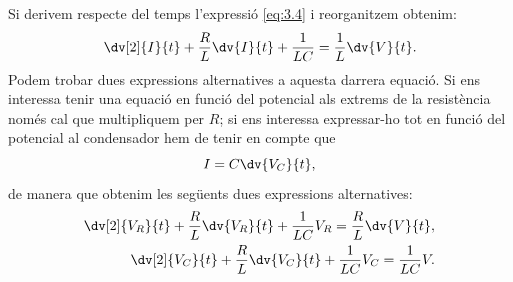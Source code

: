 \documentclass[a4paper,10.5pt]{report}
\begin{document}
Si derivem respecte del temps l'expressió \eqref{eq:3.4} i reorganitzem obtenim:
\begin{equation}
	\dv[2]{I}{t} + \frac{R}{L} \dv{I}{t}+\frac{1}{LC} = \frac{1}{L}\dv{V}{t}.\label{eq:3.8}
\end{equation}
Podem trobar dues expressions alternatives a aquesta darrera equació. Si ens interessa tenir una equació en funció del potencial als extrems de la resistència només cal que multipliquem per $R$; si ens interessa expressar-ho tot en funció del potencial al condensador hem de tenir en compte que
\begin{equation}
	I = C \dv{V_C}{t},
\end{equation}
de manera que obtenim les següents dues expressions alternatives:
\begin{align}
	\dv[2]{V_R}{t} + \frac{R}{L}\dv{V_R}{t} + \frac{1}{LC}V_R = \frac{R}{L} \dv{V}{t}, \\
	\dv[2]{V_C}{t} + \frac{R}{L}\dv{V_C}{t} + \frac{1}{LC}V_C=\frac{1}{LC}V. \label{eq:3.11}
\end{align}
\end{document}

